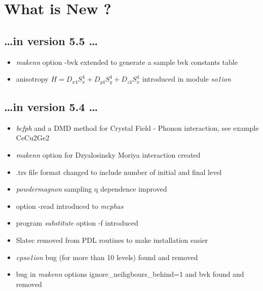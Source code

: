 \documentclass[twoside]{article}
\newcommand{\prg}{\sl}
\begin{document}
\section*{What is New ?}
\subsection*{ \dots in version 5.5 \dots}
\begin{itemize}
\item {\prg makenn} option -bvk extended to generate a sample bvk constants table 
\item anisotropy $H=D_{x4} S_x^4 +D_{y4} S_y^4 +D_{z4} S_x^4$ introduced in module {\prg so1ion}
\end{itemize}

\subsection*{ \dots in version 5.4 \dots}
\begin{itemize}
\item    {\prg bcfph} and a DMD method for Crystal Field - Phonon interaction, see example CeCu2Ge2 
\item  {\prg makenn} option for Dzyalosinsky Moriya interaction created
\item .trs file format changed to include number of initial and final level
\item   {\prg powdermagnon} sampling q dependence improved
\item option -read introduced to {\prg mcphas}
\item   program {\prg substitute} option -f introduced
\item   Slatec removed from PDL routines to make installation easier
\item {\prg cpso1ion} bug (for more than 10 levels) found and removed
\item bug in {\prg makenn} options ignore\_neihgbours\_behind=1 and bvk found and removed
\end{itemize}
\end{document}
